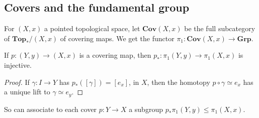 \documentclass{article}
\begin{document}
\subsection{Covers and the fundamental group}

\begin{definition}
    For $(X,x)$ a pointed topological space, let $\mathbf{Cov}(X,x)$ be the full subcategory of $\mathbf{Top}_*/(X,x)$ of covering maps. We get the functor $\pi_1:\mathbf{Cov}(X,x)\rightarrow\mathbf{Grp}$.
\end{definition}

\begin{proposition}
    If $p:(Y,y)\rightarrow (X,x)$ is a covering map, then $p_*:\pi_1(Y,y)\rightarrow \pi_1(X,x)$ is injective.\begin{proof}
        If $\gamma:I\rightarrow Y$ has $p_*([\gamma]) = [e_{x}]$, in $X$, then the homotopy $p\circ\gamma\simeq e_x$ has a unique lift to $\gamma\simeq e_y$.
    \end{proof}
\end{proposition}

So can associate to each cover $p:Y\rightarrow X$ a subgroup $p_*\pi_1(Y,y)\leq \pi_1(X,x)$.
\end{document}
